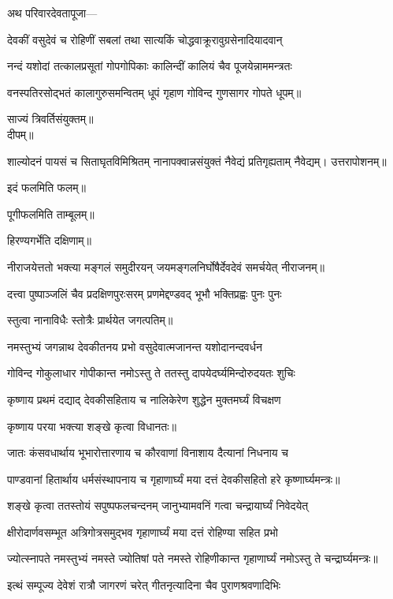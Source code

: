 अथ परिवारदेवतापूजा—

\twolineshloka
{देवकीं वसुदेवं च रोहिणीं सबलां तथा}
{सात्यकिं चोद्धवाक्रूरावुग्रसेनादियादवान्}

\twolineshloka
{नन्दं यशोदां तत्कालप्रसूतां गोपगोपिकाः}
{कालिन्दीं कालियं चैव पूजयेन्नाममन्त्रतः}

\twolineshloka
{वनस्पतिरसोद्भतं कालागुरुसमन्वितम्}
{धूपं गृहाण गोविन्द गुणसागर गोपते}
धूपम्॥

साज्यं त्रिवर्तिसंयुक्तम्॥\\
दीपम्॥

\twolineshloka
{शाल्योदनं पायसं च सिताघृतविमिश्रितम्}
{नानापक्वान्नसंयुक्तं नैवेद्यं प्रतिगृह्यताम्}
नैवेद्यम्।
उत्तरापोशनम्॥

इदं फलमिति फलम्॥

पूगीफलमिति ताम्बूलम्॥

हिरण्यगर्भेति दक्षिणाम्॥

\twolineshloka
{नीराजयेत्ततो भक्त्या मङ्गलं समुदीरयन्}
{जयमङ्गलनिर्घोषैर्देवदेवं समर्चयेत्}
नीराजनम्॥


\twolineshloka
{दत्त्वा पुष्पाञ्जलिं चैव प्रदक्षिणपुरःसरम्}
{प्रणमेद्दण्डवद् भूभौ भक्तिप्रह्वः पुनः पुनः}

स्तुत्वा नानाविधैः स्तोत्रैः प्रार्थयेत जगत्पतिम्॥

\twolineshloka
{नमस्तुभ्यं जगन्नाथ देवकीतनय प्रभो}
{वसुदेवात्मजानन्त यशोदानन्दवर्धन}

\twolineshloka
{गोविन्द गोकुलाधार गोपीकान्त नमोऽस्तु ते}
{ततस्तु दापयेदर्घ्यमिन्दोरुदयतः शुचिः}

\twolineshloka
{कृष्णाय प्रथमं दद्याद् देवकीसहिताय च}
{नालिकेरेण शुद्धेन मुक्तमर्घ्यं विचक्षण}

कृष्णाय परया भक्त्या शङ्खे कृत्वा विधानतः॥

\twolineshloka
{जातः कंसवधार्थाय भूभारोत्तारणाय च}
{कौरवाणां विनाशाय दैत्यानां निधनाय च}

\twolineshloka
{पाण्डवानां हितार्थाय धर्मसंस्थापनाय च}
{गृहाणार्घ्यं मया दत्तं देवकीसहितो हरे}
कृष्णार्घ्यमन्त्रः॥

\twolineshloka
{शङ्खे कृत्वा ततस्तोयं सपुष्पफलचन्दनम्}
{जानुभ्यामवनिं गत्वा चन्द्रायार्घ्यं निवेदयेत्}

\twolineshloka
{क्षीरोदार्णवसम्भूत अत्रिगोत्रसमुद्भव}
{गृहाणार्घ्यं मया दत्तं रोहिण्या सहित प्रभो}

\twolineshloka
{ज्योत्स्नापते नमस्तुभ्यं नमस्ते ज्योतिषां पते}
{नमस्ते रोहिणीकान्त गृहाणार्घ्यं नमोऽस्तु ते}
चन्द्रार्घ्यमन्त्रः॥

\twolineshloka
{इत्थं सम्पूज्य देवेशं रात्रौ जागरणं चरेत्}
{गीतनृत्यादिना चैव पुराणश्रवणादिभिः}

